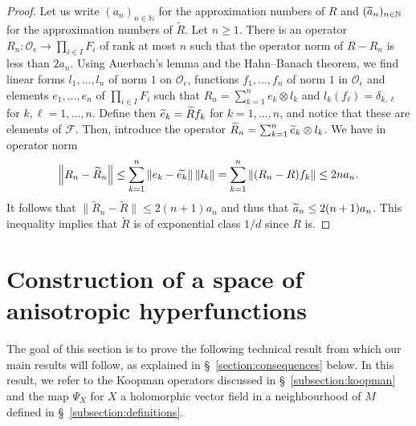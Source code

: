 \documentclass[AHL,Unicode,longabstracts,published]{cedram}
\newcommand{\n}[1]{\left\|#1\right\|}
\newcommand{\clO}{\mathcal{O}}
\newcommand{\clF}{\mathcal{F}}
\newcommand{\bbN}{\mathbb{N}}
\let\oldtilde\tilde
\renewcommand*{\tilde}[1]{\mathchoice{\widetilde{#1}}{\widetilde{#1}}{\oldtilde{#1}}{\oldtilde{#1}}}
\newcommand{\clO}{\mathcal{O}}
\begin{document}
\begin{proof}
Let us write $(a_n)_{n \in \bbN}$ for the approximation numbers of $R$ and $(\tilde{a}_n)_{n \in \bbN}$ for the approximation numbers of $\widetilde{R}$. Let $n \geq 1$. There is an operator $R_n : \clO_\epsilon \to \prod_{i  \in I} F_i$ of rank at most $n$ such that the operator norm of $R - R_n$ is less than $2 a_n$. Using Auerbach's lemma and the Hahn--Banach theorem, we find linear forms $l_1, \dots, l_n$ of norm $1$ on $\clO_\epsilon$, functions $f_1, \dots, f_n$ of norm $1$ in $\clO_\epsilon$ and elements $e_1, \dots, e_n$ of $\prod_{i \in I} F_i$ such that $R_n = \sum_{k = 1}^n e_k \otimes l_k$ and $l_k(f_\ell) = \delta_{k,\ell}$ for $k,\ell = 1, \dots, n$. Define then $\tilde{e}_k = \widetilde{R} f_k$ for $k =1, \dots, n$, and notice that these are elements of $\clF$. Then, introduce the operator $\widetilde{R}_n = \sum_{k = 1}^n \tilde{e}_k \otimes l_k$. We have in operator norm
\begin{equation*}
\n{ R_n - \widetilde{R}_n} \leq \sum_{k = 1}^n \n{e_k - \tilde{e_k}} \n{l_k} = \sum_{k =1}^n \n{(R_n - R) f_k} \leq 2 n a_n.
\end{equation*}
It follows that $\|\widetilde{R}_n - \widetilde{R}\| \leq 2(n+1) a_n$ and thus that $\tilde{a}_n \leq 2(n+1) a_n$. This inequality implies that $\widetilde{R}$ is of exponential class $1/d$ since $R$ is.
\end{proof}

\section{Construction of a space of anisotropic hyperfunctions}\label{section:construction}

The goal of this section is to prove the following technical result from which our main results will follow, as explained in \S~\ref{section:consequences} below. In this result, we refer to the Koopman operators discussed in \S~\ref{subsection:koopman} and the map $\Psi_X$ for $X$ a holomorphic vector field in a neighbourhood of $M$ defined in \S~\ref{subsection:definitions}.
\end{document}
